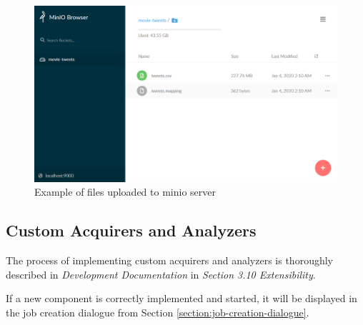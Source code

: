 \documentclass{article}
\begin{document}
\begin{figure}[h]
\includegraphics[width=\textwidth]{images/minio_files.png}
\centering
\caption{Example of files uploaded to minio server}
\label{figure:minio-uploads}
\end{figure}

\subsection{Custom Acquirers and Analyzers}
The process of implementing custom acquirers and analyzers is thoroughly described in \textit{Development Documentation} in \textit{Section 3.10 Extensibility}.

If a new component is correctly implemented and started, it will be displayed in the job creation dialogue from Section \ref{section:job-creation-dialogue}.
\end{document}
